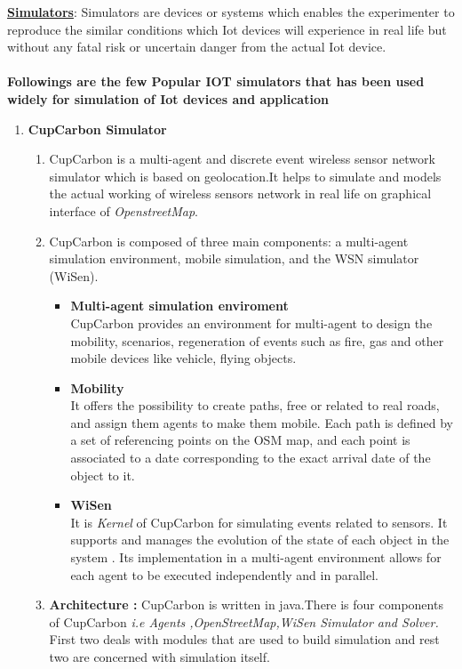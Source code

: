 \documentclass[a4paper,11pt]{article}
\begin{document}
\begin{iotsolution}

\textbf{\underline{Simulators}}: Simulators are devices or systems which enables the experimenter to reproduce the similar conditions which Iot devices will experience in real life but without any fatal risk or uncertain danger from the actual Iot device.\\\\
\textbf{Followings are the few Popular IOT simulators that has been used widely for simulation of Iot devices and application}
\begin{enumerate}[1]
\item{\textbf{CupCarbon Simulator}}\\
\begin{enumerate}
\item CupCarbon is a multi-agent and discrete event wireless sensor network simulator which is based on geolocation.It helps to simulate and models the actual working of wireless sensors network in real life on graphical interface of \emph{OpenstreetMap}.
\item CupCarbon is composed
of three main components: a multi-agent simulation environment,
mobile simulation, and the WSN simulator
(WiSen).
\begin{itemize}
    \item \textbf{Multi-agent simulation enviroment} \\
    CupCarbon provides an environment for multi-agent to design the mobility, scenarios, regeneration of events such as fire, gas and other mobile devices like vehicle, flying objects.
    \item\textbf{Mobility}\\It offers the possibility to create paths, free or related
to real roads, and assign them agents to make them
mobile. Each path is defined by a set of referencing points on
the OSM map, and each point is associated to a date corresponding
to the exact arrival date of the object to it.
\item\textbf{WiSen}\\
It is \emph{Kernel} of CupCarbon for simulating events related to sensors. It supports and manages the
evolution of the state of each object in the system . Its implementation in a multi-agent environment
allows for each agent to be executed independently
and in parallel.
\end{itemize}
\item \textbf{Architecture :} CupCarbon is written in java.There is four components of CupCarbon \emph{i.e Agents ,OpenStreetMap,WiSen Simulator and Solver.} First two deals with modules that are used to build simulation and rest two are concerned with simulation itself.

\end{enumerate}
\end{enumerate}
\end{iotsolution}
\end{document}
